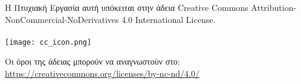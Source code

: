 Η Πτυχιακή Εργασία αυτή υπόκειται στην άδεια Creative Commons Attribution-NonCommercial-NoDerivatives 4.0 International License.
\\
\\

\texttt{[image: cc\_icon.png]}

Οι όροι της άδειας μπορούν να αναγνωστούν στο:\\
\url{https://creativecommons.org/licenses/by-nc-nd/4.0/}